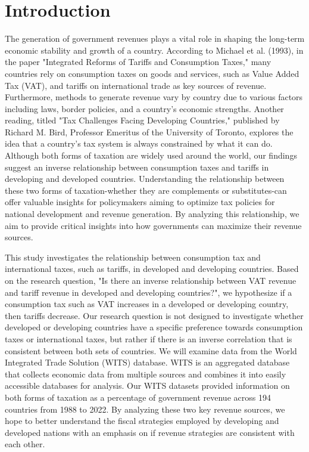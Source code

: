 \documentclass[12pt]{article}
\begin{document}
\section{Introduction} \label{sec:introduction}
The generation of government revenues plays a vital role in shaping the long-term economic stability and growth of a country. According to Michael et al. (1993), in the paper "Integrated Reforms of Tariffs and Consumption Taxes," many countries rely on consumption taxes on goods and services, such as Value Added Tax (VAT), and tariffs on international trade as key sources of revenue. Furthermore, methods to generate revenue vary by country due to various factors including laws, border policies, and a country's economic strengths. Another reading, titled "Tax Challenges Facing Developing Countries," published by Richard M. Bird, Professor Emeritus of the University of Toronto, explores the idea that a country's tax system is always constrained by what it can do. Although both forms of taxation are widely used around the world, our findings suggest an inverse relationship between consumption taxes and tariffs in developing and developed countries. Understanding the relationship between these two forms of taxation-whether they are complements or substitutes-can offer valuable insights for policymakers aiming to optimize tax policies for national development and revenue generation. By analyzing this relationship, we aim to provide critical insights into how governments can maximize their revenue sources. 

This study investigates the relationship between consumption tax and international taxes, such as tariffs, in developed and developing countries. Based on the research question, "Is there an inverse relationship between VAT revenue and tariff revenue in developed and developing countries?", we hypothesize if a consumption tax such as VAT increases in a developed or developing country, then tariffs decrease. Our research question is not designed to investigate whether developed or developing countries have a specific preference towards consumption taxes or international taxes, but rather if there is an inverse correlation that is consistent between both sets of countries. We will examine data from the World Integrated Trade Solution (WITS) database. WITS is an aggregated database that collects economic data from multiple sources and combines it into easily accessible databases for analysis. Our WITS datasets provided information on both forms of taxation as a percentage of government revenue across 194 countries from 1988 to 2022. By analyzing these two key revenue sources, we hope to better understand the fiscal strategies employed by developing and developed nations with an emphasis on if revenue strategies are consistent with each other. 
\end{document}
